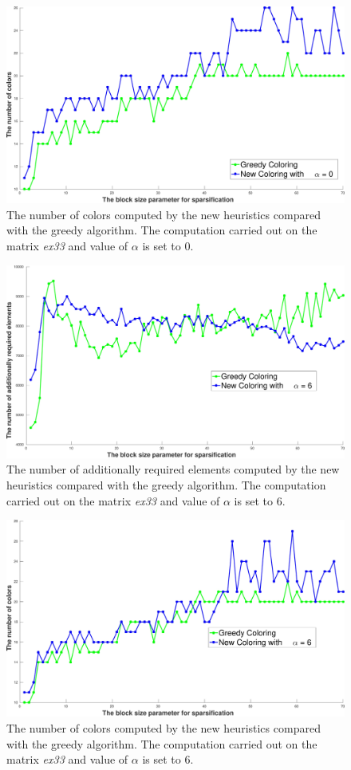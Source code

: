 \documentclass[12pt, oneside]{book}
\begin{document}
\begin{figure}
\centering
\includegraphics[width=0.9\linewidth]{bls_col_alpha_0}
\caption{The number of colors computed by the new heuristics compared with the 
greedy algorithm. The computation carried out on the matrix \textit{ex33} and value of $\alpha$ is 
set to $0$.}
\label{new.col.col.alpha.zero}
\end{figure}

\begin{figure}
\centering
\includegraphics[width=0.9\linewidth]{bls_add_alpha_6}
\caption{The number of additionally required elements computed by the new heuristics compared with the 
greedy algorithm. The computation carried out on the matrix \textit{ex33} and value of $\alpha$ is 
set to $6$.}
\label{new.col.add.alpha.six}
\end{figure}
\begin{figure}
\centering
\includegraphics[width=0.9\linewidth]{bls_col_alpha_6}
\caption{The number of colors computed by the new heuristics compared with the 
greedy algorithm. The computation carried out on the matrix \textit{ex33} and value of $\alpha$ is 
set to $6$.}
\label{new.col.col.alpha.six}
\end{figure}
\end{document}
